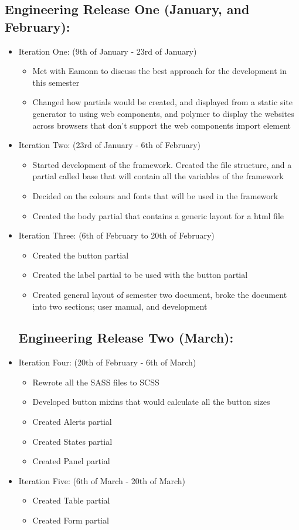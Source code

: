 \subsection*{Engineering Release One (January, and February):}
\begin{itemize}
	\item Iteration One: (9th of January - 23rd of January)\begin{itemize} 
	\item Met with Eamonn to discuss the best approach for the development in this semester
	\item Changed how partials would be created, and displayed from a static site generator to using web components, and polymer to display the websites across browsers that don't support the web components import element
	\end{itemize}
	\item Iteration Two: (23rd of January - 6th of February) \begin{itemize}
	\item Started development of the framework. Created the file structure, and a partial called base that will contain all the variables of the framework
	\item Decided on the colours and fonts that will be used in the framework
	\item Created the body partial that contains a generic layout for a html file
	\end{itemize}
	\item Iteration Three: (6th of February to 20th of February)\begin{itemize}
	\item Created the button partial
	\item Created the label partial to be used with the button partial
	\item Created general layout of semester two document, broke the document into two sections; user manual, and development
	\end{itemize}
	\subsection*{Engineering Release Two (March):}
	\item Iteration Four: (20th of February - 6th of March)\begin{itemize} 
	\item Rewrote all the SASS files to SCSS
	\item Developed button mixins that would calculate all the button sizes
	\item Created Alerts partial
	\item Created States partial
	\item Created Panel partial
	\end{itemize}
	\item Iteration Five: (6th of March - 20th of March) \begin{itemize}
	\item Created Table partial
	\item Created Form partial
	\end{itemize}

\end{itemize}
